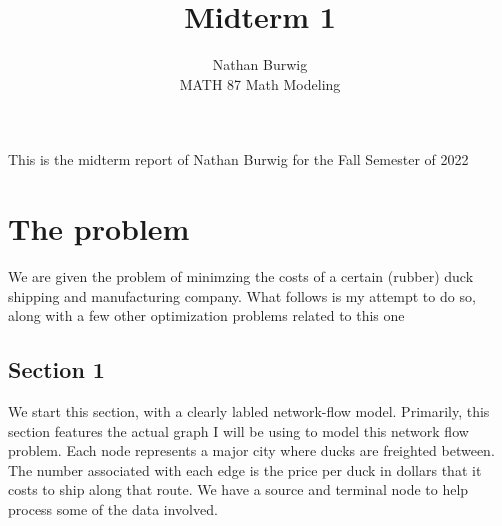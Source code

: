 \documentclass[11pt]{article}
\begin{document}
\title{Midterm 1}

\author{Nathan Burwig \\ MATH 87 Math Modeling} 
\maketitle

    This is the midterm report of Nathan Burwig for the Fall Semester of 2022
    
    \section{The problem}
        We are given the problem of minimzing the costs of a certain (rubber) duck
        shipping and manufacturing company. What follows is my attempt to do
        so, along with a few other optimization problems related to this one

        \subsection{Section 1}

        We start this section, with a clearly labled network-flow model.
        Primarily, this section features the actual graph I will be using to
        model this network flow problem. Each node represents a major city
        where ducks are freighted between. The number associated with each edge
        is the price per duck in dollars that it costs to ship along that
        route. We have a source and terminal node to help process some of the
        data involved. \\
\end{document}
